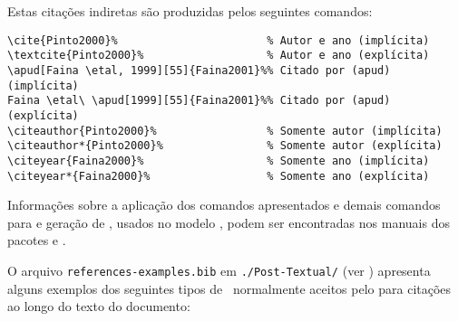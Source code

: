 \noindent Estas citações indiretas são produzidas pelos seguintes comandos:

\begin{snugshade}
\begin{Verbatim}
\cite{Pinto2000}%                       % Autor e ano (implícita)
\textcite{Pinto2000}%                   % Autor e ano (explícita)
\apud[Faina \etal, 1999][55]{Faina2001}%% Citado por (apud) (implícita)
Faina \etal\ \apud[1999][55]{Faina2001}%% Citado por (apud) (explícita)
\citeauthor{Pinto2000}%                 % Somente autor (implícita)
\citeauthor*{Pinto2000}%                % Somente autor (explícita)
\citeyear{Faina2000}%                   % Somente ano (implícita)
\citeyear*{Faina2000}%                  % Somente ano (explícita)
\end{Verbatim}
\end{snugshade}

Informações sobre a aplicação dos comandos apresentados e demais comandos para  e geração de , usados no modelo , podem ser encontradas nos manuais dos pacotes \href{https://ctan.org/pkg/biblatex}{\LinkIcon} e \href{https://ctan.org/pkg/biblatex-abnt}{\LinkIcon}.

O arquivo \texttt{references-examples.bib} em \texttt{./Post-Textual/} (ver ) apresenta alguns exemplos dos seguintes tipos de \ normalmente aceitos pelo \href{https://ctan.org/pkg/biblatex}{\LinkIcon} para citações ao longo do texto do documento:

